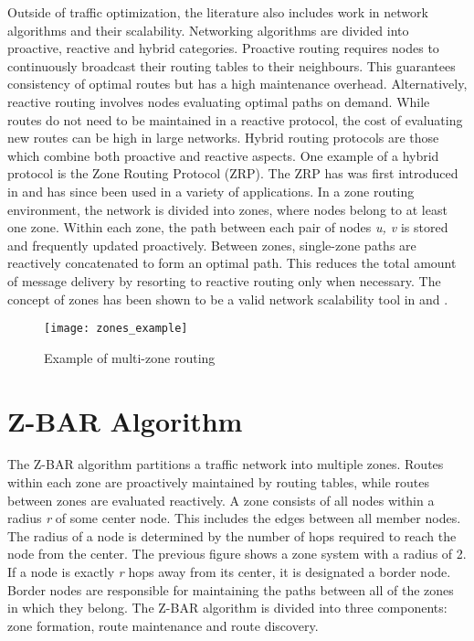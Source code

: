 \documentclass[conference]{IEEEtran}
\begin{document}
Outside of traffic optimization, the literature also includes work in network algorithms and their scalability. Networking algorithms are divided into proactive, reactive and hybrid categories. Proactive routing requires nodes to continuously broadcast their routing tables to their neighbours. This guarantees consistency of optimal routes but has a high maintenance overhead. Alternatively, reactive routing involves nodes evaluating optimal paths on demand. While routes do not need to be maintained in a reactive protocol, the cost of evaluating new routes can be high in large networks. Hybrid routing protocols are those which combine both proactive and reactive aspects. One example of a hybrid protocol is the Zone Routing Protocol (ZRP). The ZRP has was first introduced in \cite{zrp} and has since been used in a variety of applications. In a zone routing environment, the network is divided into zones, where nodes belong to at least one zone. Within each zone, the path between each pair of nodes \textit{u, v} is stored and frequently updated proactively. Between zones, single-zone paths are reactively concatenated to form an optimal path. This reduces the total amount of message delivery by resorting to reactive routing only when necessary. The concept of zones has been shown to be a valid network scalability tool in \cite{hopnet} and \cite{mazacornet}.

\begin{figure}[h]
\caption{Example of multi-zone routing}
\centering
\texttt{[image: zones\_example]}
\end{figure}

\section{Z-BAR Algorithm}

The Z-BAR algorithm partitions a traffic network into multiple zones. Routes within each zone are proactively maintained by routing tables, while routes between zones are evaluated reactively. A zone consists of all nodes within a radius \textit{r} of some center node. This includes the edges between all member nodes. The radius of a node is determined by the number of hops required to reach the node from the center. The previous figure shows a zone system with a radius of 2. If a node is exactly \textit{r} hops away from its center, it is designated a border node. Border nodes are responsible for maintaining the paths between all of the zones in which they belong. The Z-BAR algorithm is divided into three components: zone formation, route maintenance and route discovery.
\end{document}
